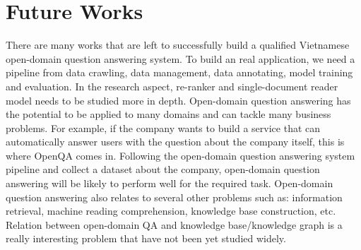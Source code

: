 \documentclass[12pt, sort&compress]{report}
\begin{document}
\section{Future Works}
\label{sec:6.2}
There are many works that are left to successfully build a qualified Vietnamese open-domain question answering system. To build an real application, we need a pipeline from data crawling, data management, data annotating, model training and evaluation. In the research aspect, re-ranker and single-document reader model needs to be studied more in depth. Open-domain question answering has the potential to be applied to many domains and can tackle many business problems. For example, if the company wants to build a service that can automatically answer users with the question about the company itself, this is where OpenQA comes in. Following the open-domain question answering system pipeline and collect a dataset about the company, open-domain question answering will be likely to perform well for the required task. Open-domain question answering also relates to several other problems such as: information retrieval, machine reading comprehension, knowledge base construction, etc. Relation between open-domain QA and knowledge base/knowledge graph is a really interesting problem that have not been yet studied widely.
\newpage


\end{document}
